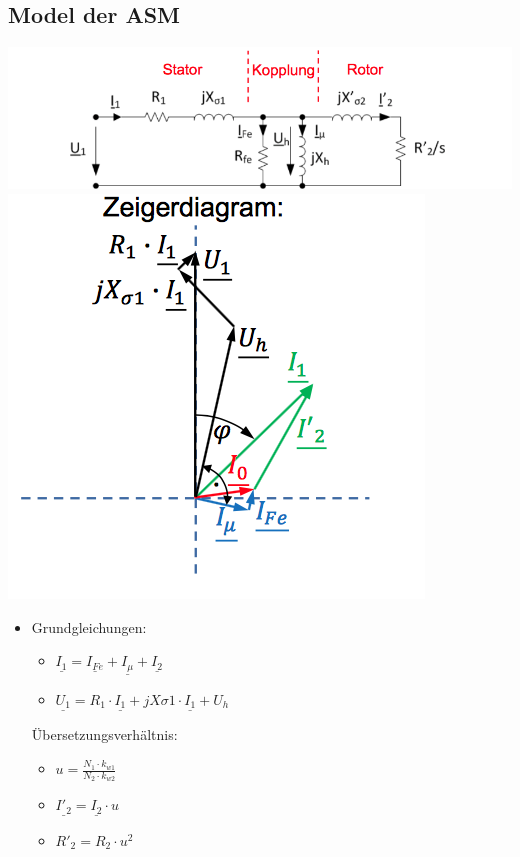 \subsection{Model der ASM}
\begin{minipage}{0.3 \linewidth}
\includegraphics[width = \linewidth]{./Pics/VL1213/ModellASM} \\
\includegraphics[width = 0.5 \linewidth]{./Pics/VL1213/Zeigerdiagramm}
\end{minipage}
\begin{minipage}{0.3 \linewidth}
\begin{itemize}
\item Grundgleichungen: 
\begin{itemize}
\item $\underline{I_1} = \underline{I_{Fe}} + \underline{I_\mu} + \underline{I_2}$ 
\item $\underline{U_1} = R_1 \cdot \underline{I_1} + jX{\sigma 1} \cdot \underline{I_1} + U_h$
\end{itemize}
Übersetzungsverhältnis:
\begin{itemize}
\item $u = \frac{N_1 \cdot k_{w1}}{N_2 \cdot k_{w2}}$
\item $\underline{I'_2} = \underline{I_2} \cdot u$
\item $R'_2 = R_2 \cdot u^2$  
\end{itemize}
\end{itemize}
\end{minipage}
